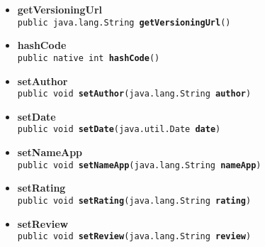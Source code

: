 {{{{{{\begin{itemize}
{}%
\item{ 
\hypertarget{it.unisa.sesa.repominer.db.entities.Review.getVersioningUrl()}{{\bf  getVersioningUrl}\\}
\texttt{public java.lang.String\ {\bf  getVersioningUrl}()
\label{it.unisa.sesa.repominer.db.entities.Review.getVersioningUrl()}}%
}%
\item{ 
\hypertarget{it.unisa.sesa.repominer.db.entities.Review.hashCode()}{{\bf  hashCode}\\}
\texttt{public native int\ {\bf  hashCode}()
\label{it.unisa.sesa.repominer.db.entities.Review.hashCode()}}%
}%
\item{ 
\hypertarget{it.unisa.sesa.repominer.db.entities.Review.setAuthor(java.lang.String)}{{\bf  setAuthor}\\}
\texttt{public void\ {\bf  setAuthor}(\texttt{java.lang.String} {\bf  author})
\label{it.unisa.sesa.repominer.db.entities.Review.setAuthor(java.lang.String)}}%
}%
\item{ 
\hypertarget{it.unisa.sesa.repominer.db.entities.Review.setDate(java.util.Date)}{{\bf  setDate}\\}
\texttt{public void\ {\bf  setDate}(\texttt{java.util.Date} {\bf  date})
\label{it.unisa.sesa.repominer.db.entities.Review.setDate(java.util.Date)}}%
}%
\item{ 
\hypertarget{it.unisa.sesa.repominer.db.entities.Review.setNameApp(java.lang.String)}{{\bf  setNameApp}\\}
\texttt{public void\ {\bf  setNameApp}(\texttt{java.lang.String} {\bf  nameApp})
\label{it.unisa.sesa.repominer.db.entities.Review.setNameApp(java.lang.String)}}%
}%
\item{ 
\hypertarget{it.unisa.sesa.repominer.db.entities.Review.setRating(java.lang.String)}{{\bf  setRating}\\}
\texttt{public void\ {\bf  setRating}(\texttt{java.lang.String} {\bf  rating})
\label{it.unisa.sesa.repominer.db.entities.Review.setRating(java.lang.String)}}%
}%
\item{ 
\hypertarget{it.unisa.sesa.repominer.db.entities.Review.setReview(java.lang.String)}{{\bf  setReview}\\}
\texttt{public void\ {\bf  setReview}(\texttt{java.lang.String} {\bf  review})
}}
\end{itemize}}}}}}}
